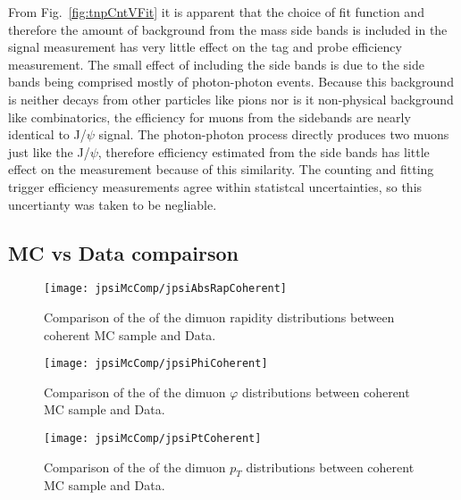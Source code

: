       From Fig.~\ref{fig:tnpCntVFit} it is apparent that the choice of fit 
        function and therefore the amount of background from the mass side 
        bands is included in the signal measurement has very little effect on 
        the tag and probe efficiency measurement.
      The small effect of including the side bands is due to the side bands 
        being comprised mostly of photon-photon events.
      Because this background is neither decays from other particles like pions
        nor is it non-physical background like combinatorics, the efficiency
        for muons from the sidebands are nearly identical to J/$\psi$ signal.
      The photon-photon process directly produces two muons just like the 
        J/$\psi$, therefore efficiency estimated from the side bands has 
        little effect on the measurement because of this similarity.
      The counting and fitting trigger efficiency measurements agree within 
        statistcal uncertainties, so this uncertianty was taken to be negliable.

    \subsection{MC vs Data compairson}
      \begin{figure}[h]
        \centering
        \texttt{[image: jpsiMcComp/jpsiAbsRapCoherent]}
        \caption{Comparison of the of the dimuon rapidity distributions between 
          coherent MC sample and Data.}
        \label{fig:jpsiAbsRapCoherent}
      \end{figure}
      \begin{figure}[h]
        \centering
        \texttt{[image: jpsiMcComp/jpsiPhiCoherent]}
        \caption{Comparison of the of the dimuon $\varphi$ distributions 
          between coherent MC sample and Data.}
        \label{fig:jpsiPhiCoherent}
      \end{figure}
      \begin{figure}[h]
        \centering
        \texttt{[image: jpsiMcComp/jpsiPtCoherent]}
        \caption{Comparison of the of the dimuon $p_{T}$ distributions 
          between coherent MC sample and Data.}
        \label{fig:jpsiPtCoherent}
      \end{figure}

